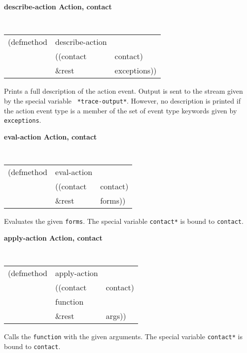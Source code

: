 \documentclass[twoside]{book}
\begin{document}
\begin{sloppy}
{\samepage
{\large {\bf describe-action \hfill Action, contact}}
\begin{flushright} 
\parbox[t]{6.125in}{
\tt
\begin{tabular}{lll}
\raggedright
(defmethod & describe-action & \\
& ((contact  &contact)\\
& \&rest & exceptions))
\end{tabular}
\rm
}\end{flushright}}
\begin{flushright} 
\parbox[t]{6.125in}{
Prints a full description of the action event. Output is sent
to the stream given by the special variable {\tt
*trace-output*}.
However, no description is printed if the action event type is a member
of the set of  event type
keywords given by {\tt exceptions}.}\end{flushright}

{\samepage
{\large {\bf eval-action \hfill Action, contact}}
\begin{flushright} 
\parbox[t]{6.125in}{
\tt
\begin{tabular}{lll}
\raggedright
(defmethod & eval-action & \\
& ((contact  &contact)\\
& \&rest & forms))
\end{tabular}
\rm
}\end{flushright}}
\begin{flushright} 
\parbox[t]{6.125in}{
Evaluates the given {\tt forms}.
The special variable {\tt *contact*}
is bound to {\tt contact}.
}\end{flushright}

{\samepage
{\large {\bf apply-action \hfill Action, contact}}
\begin{flushright} 
\parbox[t]{6.125in}{
\tt
\begin{tabular}{lll}
\raggedright
(defmethod & apply-action & \\
& ((contact  &contact)\\
& function \\
& \&rest & args))
\end{tabular}
\rm
}\end{flushright}}
\begin{flushright} 
\parbox[t]{6.125in}{
Calls the {\tt function} with the given arguments.
The special variable {\tt *contact*}
is bound to {\tt contact}.
}\end{flushright}



\end{sloppy}
\end{document}
